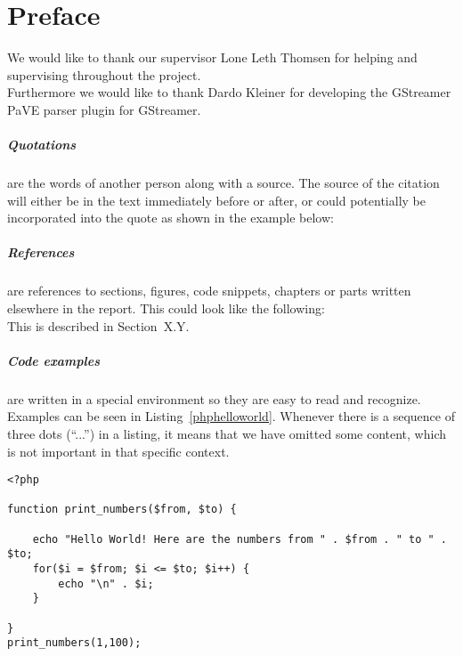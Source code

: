 \chapter*{Preface}
\label{preface}
We would like to thank our supervisor Lone Leth Thomsen for helping and supervising throughout the project.\\
Furthermore we would like to thank Dardo Kleiner for developing the GStreamer PaVE parser plugin for GStreamer.


\paragraph{Quotations} are the words of another person along with a source.
The source of the citation will either be in the text immediately before or after, or could potentially be incorporated into the quote as shown in the example below: \\


\paragraph{References} are references to sections, figures, code snippets, chapters or parts written elsewhere in the report.
This could look like the following:\\

This is described in Section~X.Y.

\paragraph{Code examples} are written in a special environment so they are easy to read and recognize.
Examples can be seen in Listing~\ref{phphelloworld}.
Whenever there is a sequence of three dots (``...'') in a listing, it means that we have omitted some content, which is not important in that specific context.

\begin{lstlisting}[style=sourceCode, caption={Code example of a hello world script written in PHP.}, label=phphelloworld]
<?php

function print_numbers($from, $to) {
    
    echo "Hello World! Here are the numbers from " . $from . " to " . $to;
    for($i = $from; $i <= $to; $i++) {
        echo "\n" . $i;
    }
    
}
print_numbers(1,100);

\end{lstlisting}